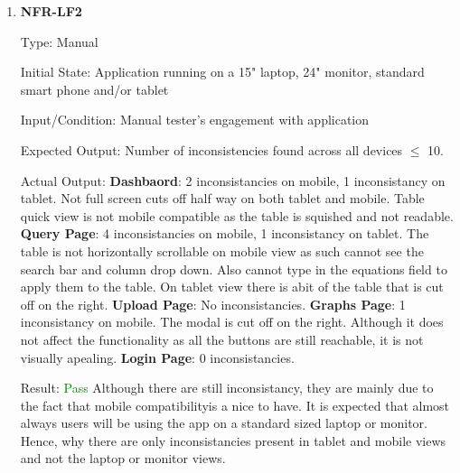 \documentclass[12pt, titlepage]{article}
\begin{document}
\begin{enumerate}
\item{\textbf{NFR-LF2}} \label{NFR:LF2}

Type: Manual

Initial State: Application running on a 15" laptop, 24" monitor, standard smart
phone and/or tablet

Input/Condition: Manual tester's engagement with application

Expected Output: Number of inconsistencies found across all devices $\leq$ 10.

Actual Output: \newline
\textbf{Dashbaord}: 2 inconsistancies on mobile, 1 inconsistancy on tablet. Not
full screen cuts off half way on both tablet and mobile. Table quick view is not
mobile compatible as the table is squished and not readable.\newline
\textbf{Query Page}: 4 inconsistancies on mobile, 1 inconsistancy on tablet. The
table is not horizontally scrollable on mobile view as such cannot see the
search bar and column drop down. Also cannot type in the equations field to
apply them to the table. On tablet view there is abit of the table that is cut
off on the right. \newline
\textbf{Upload Page}: No inconsistancies.\newline
\textbf{Graphs Page}: 1 inconsistancy on mobile. The modal is cut off on the
right. Although it does not affect the functionality as all the buttons are
still reachable, it is not visually apealing. \newline
\textbf{Login Page}: 0 inconsistancies.

Result: \textcolor{green}{Pass} \newline
Although there are still inconsistancy, they are
mainly due to the fact that mobile compatibilityis a nice to have. It is
expected that almost always users will be using the app on a standard sized
laptop or monitor. Hence, why there are only inconsistancies present in tablet
and mobile views and not the laptop or monitor views. \end{enumerate}
\end{document}
